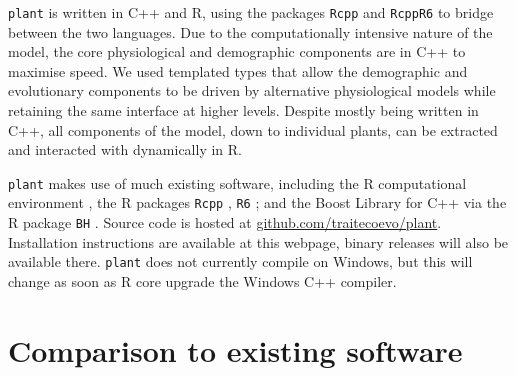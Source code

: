 \documentclass[a4paper,11pt]{article}
\newcommand{\plant}{\texttt{plant}}
\begin{document}
{\plant} is written in C++ and R, using the packages \texttt{Rcpp}
\citep{Eddelbuettel-2011, Eddelbuettel-2013} and \texttt{RcppR6}
\citep{RcppR6} to bridge between the two languages. Due to the
computationally intensive nature of the model, the core physiological
and demographic components are in C++ to maximise speed. We used
templated types that allow the demographic and evolutionary components
to be driven by alternative physiological models while retaining the
same interface at higher levels. Despite mostly being written in C++,
all components of the model, down to individual plants, can be
extracted and interacted with dynamically in R.

{\plant} makes use of much existing software, including the R
computational environment \citep{R-2015}, the R packages \texttt{Rcpp}
\citep{Eddelbuettel-2011, Eddelbuettel-2013}, \texttt{R6}
\citep{Chang-2014}; and the Boost Library for C++
\citep{Schaling-2014} via the R package \texttt{BH}
\citep{Eddelbuettel-2015}. Source code is hosted at
\href{https://github.com/traitecoevo/plant}{github.com/traitecoevo/plant}.
Installation instructions are available at this webpage, binary
releases will also be available there.  {\plant} does not
currently compile on Windows, but this will change as soon as R core
upgrade the Windows C++ compiler.

\section{Comparison to existing software}
\end{document}
